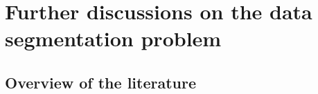 \documentclass[11pt, a4paper]{article}
\def\wh{\widehat}
\newcommand{\cp}{\theta}
\theoremstyle{definition}
\theoremstyle{definition}
\theoremstyle{definition}
\theoremstyle{definition}
\theoremstyle{definition}
\theoremstyle{remark}
\theoremstyle{definition}
\theoremstyle{definition}
\theoremstyle{definition}
\begin{document}


\clearpage

\appendix


\section{Further discussions on the data segmentation problem}

\subsection{Overview of the literature}
\label{sec:comparison}
\end{document}
